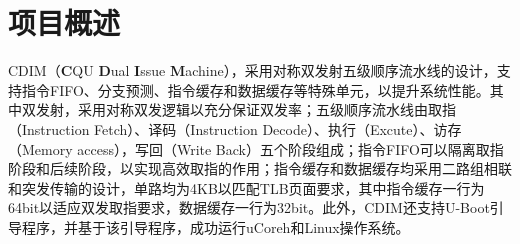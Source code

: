 \section{项目概述}
CDIM（\textbf{C}QU \textbf{D}ual \textbf{I}ssue \textbf{M}achine），采用对称双发射五级顺序流水线的设计，支持指令FIFO、分支预测、指令缓存和数据缓存等特殊单元，以提升系统性能。其中双发射，采用对称双发逻辑以充分保证双发率；五级顺序流水线由取指（Instruction Fetch）、译码（Instruction Decode）、执行（Excute）、访存（Memory access），写回（Write Back）五个阶段组成；指令FIFO可以隔离取指阶段和后续阶段，以实现高效取指的作用；指令缓存和数据缓存均采用二路组相联和突发传输的设计，单路均为4KB以匹配TLB页面要求，其中指令缓存一行为64bit以适应双发取指要求，数据缓存一行为32bit。\todo 此外，CDIM还支持U-Boot引导程序，并基于该引导程序，成功运行uCoreh和Linux操作系统。
